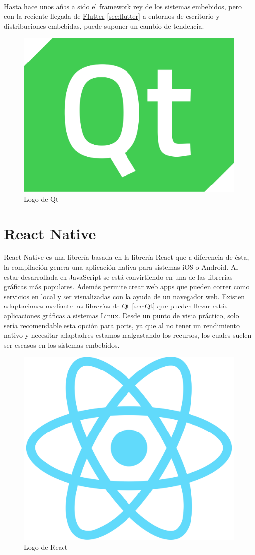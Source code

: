 \paragraph{}Hasta hace unos años a sido el framework rey de los sistemas embebidos, pero
con la reciente llegada de \hyperref[sec:flutter]{Flutter} \ref{sec:flutter} a entornos
de escritorio y distribuciones embebidas, puede suponer un cambio de tendencia.

\begin{figure}[H]
	\centering
	\includegraphics[width=0.30\linewidth]{imgs/qt}
	\caption[Qt Logo]{Logo de Qt}
	\label{fig:qt}
\end{figure}


\section{React Native}\label{sec:react}

\paragraph{}React Native es una librería basada en la librería React que a diferencia
de ésta, la compilación genera una aplicación nativa para sistemas iOS o Android. Al
estar desarrollada en JavaScript se está convirtiendo en una de las librerías gráficas
más populares. Además permite crear web apps que pueden correr como servicios en local
y ser visualizadas con la ayuda de un navegador web. Existen adaptaciones mediante las
librerías de \hyperref[sec:Qt]{Qt} \ref{sec:Qt} que pueden llevar estás aplicaciones
gráficas a sistemas Linux. Desde un punto de vista práctico, solo sería recomendable
esta opción para \gls{ports}, ya que al no tener un rendimiento nativo y necesitar
adaptadres estamos malgastando los recursos, los cuales suelen ser escasos en los sistemas
embebidos.

\begin{figure}[H]
	\centering
	\includegraphics[width=0.30\linewidth]{imgs/react-logo}
	\caption[React Logo]{Logo de React}
	\label{fig:react}
\end{figure}


